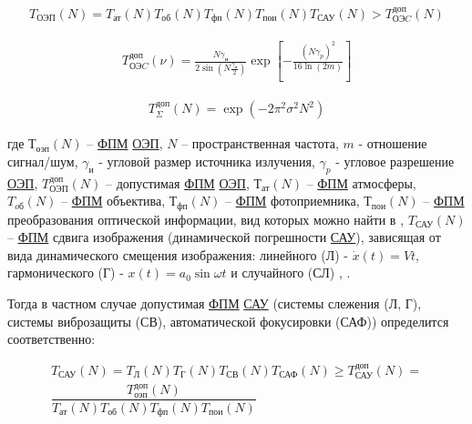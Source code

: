\begin{equation}
\label{eq:p2:2.5}
\begin{alignedat}{2}
T_{\textit{ОЭП}}(N)=
T_{\textit{ат}}(N)T_{\textit{об}}(N)T_{\textit{фп}}(N)T_{\textit{пои}}(N)T_{\textit{САУ}}(N)>
T_{\textit{ОЭC}}^{\textit{доп}}(N)
\end{alignedat}
\end{equation}

\begin{equation}
\label{eq:p2:3}
\begin{alignedat}{2}
T_{\textit{ОЭC}}^{\textit{доп}}\left(\nu{}\right)=
\frac{N{\gamma{}}_\textit{и}}{2\sin{\left(N\frac{{\gamma{}}_\textit{и}}{2}\right)}}
\exp{\left[-\frac{{\left(N{\gamma{}}_p\right)}^2}{16\ln{\left(2m\right)}}\right]}
\end{alignedat}
\end{equation}

\begin{equation}
\label{eq:p2:4}
\begin{alignedat}{2}
T_{\Sigma{}}^{\textit{доп}}\left(N\right)=\exp{\left(-2{\pi{}}^2{\sigma{}}^2N^2\right)}
\end{alignedat}
\end{equation}

где 
$Т_{\textit{оэп}}(N)$ – \hyperref[acroFPM]{ФПМ}  \hyperref[acroEOS]{ОЭП}, 
$N$ – пространственная частота, 
$m$ - отношение сигнал/шум, 
$\gamma_\textit{и}$ - угловой размер источника излучения, 
$\gamma_\textit{p}$ - угловое разрешение  \hyperref[acroEOS]{ОЭП}, 
$T_{\textit{ОЭП}}^{\textit{доп}}(N)$ – допустимая \hyperref[acroFPM]{ФПМ}  \hyperref[acroEOS]{ОЭП}, 
$Т_\textit{ат}(N)$ – \hyperref[acroFPM]{ФПМ} атмосферы, 
$T_\textit{oб}(N)$ – \hyperref[acroFPM]{ФПМ} объектива, 
$Т_\textit{фп}(N)$ – \hyperref[acroFPM]{ФПМ} фотоприемника, 
$Т_\textit{пои}(N)$ – \hyperref[acroFPM]{ФПМ} преобразования оптической информации, вид которых можно найти  в \cite[]{Tarasov}, 
$T_{\textit{САУ}}(N)$ – \hyperref[acroFPM]{ФПМ} сдвига изображения (динамической погрешности \hyperref[acroSAU]{САУ}), зависящая от вида динамического смещения изображения: линейного (Л) - $\dot{x}(t) = Vt$, 
гармонического (Г) - $x(t)=a_{0}\sin{\omega t}$ и 
случайного (СЛ) \cite[]{Tarasov}, \cite[]{Sokolski22}.

Тогда в частном случае допустимая \hyperref[acroFPM]{ФПМ} \hyperref[acroSAU]{САУ} (системы слежения (Л, Г), системы виброзащиты (СВ), автоматической фокусировки (САФ)) определится соответственно: 

\begin{equation}
\label{eq:p2:6}
\begin{alignedat}{2}
T_{\textit{САУ}}\left(N\right)=
T_\textit{Л}\left(N\right)T_\textit{Г}\left(N\right)T_{\textit{СВ}}\left(N\right)T_{\textit{САФ}}\left(N\right)\geq{}T_{\textit{САУ}}^{\textit{доп}}(N)= \\
\dfrac{ T_{\textit{оэп}}^{\textit{доп}}(N) }{ T_{\textit{ат}}(N)T_{\textit{об}}(N)T_{\textit{фп}}(N)T_{\textit{пои}}(N) }
\end{alignedat}
\end{equation}

